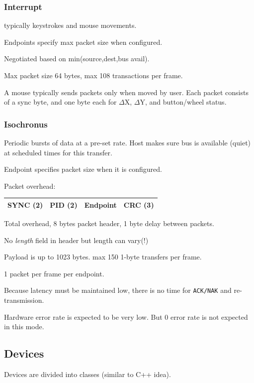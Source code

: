 \documentclass{article}	%
\begin{document}
\subsubsection{Interrupt}
typically keystrokes and mouse movements.

Endpoints specify max packet size when configured.

Negotiated based on min(source,dest,bus avail).

Max packet size 64 bytes, max 108 transactions per frame.

A mouse typically sends packets only when moved by user.
Each packet consists of a sync byte, and one byte each
for $\Delta$X, $\Delta$Y, and button/wheel status.

\subsubsection{Isochronus}

Periodic bursts of data at a pre-set rate.   Host
makes sure bus is available (quiet) at scheduled
times for this transfer.

Endpoint specifies packet size when it is configured.

Packet overhead:

\begin{tabular}{|c|c|c|c| }
\hline
SYNC (2)  & PID (2) & Endpoint & CRC (3)   \\
\hline
\end{tabular}

Total overhead, 8 bytes packet header, 1 byte delay between
packets.

No {\it length} field in header but length can vary(!)

Payload is up to 1023 bytes.  max 150 1-byte transfers
per frame.

1 packet per frame per endpoint.

Because latency must be maintained low, there is
no time for {\tt ACK/NAK} and re-transmission.

Hardware error rate is expected to be very low.
But 0 error rate is not expected in this mode.

\subsection{Devices}

Devices are divided into classes (similar to C++ idea).
\end{document}
